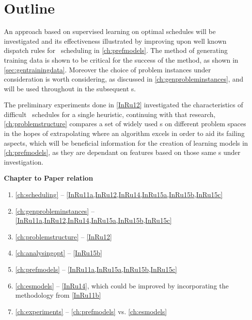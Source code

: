 




\section{Outline}
An approach based on supervised learning on optimal schedules will be 
investigated and its effectiveness illustrated by improving upon well known 
dispatch rules for \jsp\ scheduling in \cref{ch:prefmodels}. The method of 
generating training data is shown to be critical for the success of the method, 
as shown in \cref{sec:gentrainingdata}. Moreover the choice of problem 
instances under consideration is worth considering, as discussed in 
\cref{ch:genprobleminstances}, and will be used throughout in the subsequent 
s. 

The preliminary experiments done in \cref{InRu12} investigated the 
characteristics of difficult \jsp\ schedules for a single heuristic, continuing 
with that research, \cref{ch:problemstructure} compares a set of widely used 
\dr s on different problem spaces in the hopes of extrapolating 
where an algorithm excels in order to aid its failing aspects, which will be 
beneficial information for the creation of learning models in 
\cref{ch:prefmodels}, as they are dependant  on features based on those same 
\dr s under investigation.

\vfill
\noindent \textbf{Chapter to Paper relation}
\begin{enumerate}
  \item \cref{ch:scheduling} --
  \cref{InRu11a,InRu12,InRu14,InRu15a,InRu15b,InRu15c}
  \item \cref{ch:genprobleminstances} --
  \cref{InRu11a,InRu12,InRu14,InRu15a,InRu15b,InRu15c}
  \item \cref{ch:problemstructure} -- \cref{InRu12}
  \item \cref{ch:analysingopt} -- \cref{InRu15b}
  \item \cref{ch:prefmodels} -- \cref{InRu11a,InRu15a,InRu15b,InRu15c}
  \item \cref{ch:esmodels} -- \cref{InRu14}, which could be improved by 
  incorporating the methodology from \cref{InRu11b}
  \item \cref{ch:experiments} -- \cref{ch:prefmodels} vs. \cref{ch:esmodels}
\end{enumerate}

